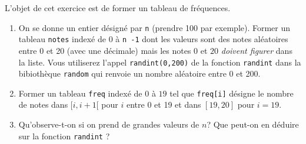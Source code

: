 L'objet de cet exercice est de former un tableau de fréquences.
\begin{enumerate}
  \item On se donne un entier désigné par \texttt{n} (prendre 100 par exemple). Former un tableau \texttt{notes} indexé de 0 à \texttt{n -1} dont les valeurs sont des notes aléatoires entre 0 et 20 (avec une décimale) mais les notes $0$ et $20$ \emph{doivent figurer} dans la liste. Vous utiliserez l'appel \texttt{randint(0,200)} de la fonction \texttt{randint} dans la bibiothèque \texttt{random} qui renvoie un nombre aléatoire entre 0 et 200.
  \item Former un tableau \texttt{freq} indexé de $0$ à $19$ tel que \texttt{freq[i]} désigne le nombre de notes dans $[i,i+1[$ pour $i$ entre 0 et 19 et dans $[19,20]$ pour $i=19$.
  \item  Qu'observe-t-on si on prend de grandes valeurs de $n$? Que peut-on en déduire sur la fonction \texttt{randint} ?
\end{enumerate}
